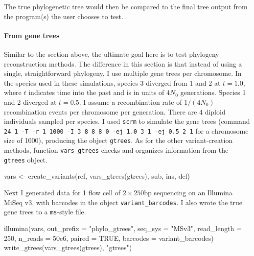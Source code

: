 \documentclass[12pt,]{article}
\newenvironment{Shaded}{}{}
\newcommand{\DataTypeTok}[1]{#1}
\newcommand{\DecValTok}[1]{#1}
\newcommand{\FloatTok}[1]{#1}
\newcommand{\KeywordTok}[1]{\textcolor[rgb]{0.00,0.00,1.00}{#1}}
\newcommand{\NormalTok}[1]{#1}
\newcommand{\OtherTok}[1]{\textcolor[rgb]{1.00,0.25,0.00}{#1}}
\newcommand{\StringTok}[1]{\textcolor[rgb]{0.00,0.50,0.50}{#1}}
\let\oldparagraph\paragraph
\renewcommand{\paragraph}[1]{\oldparagraph{#1}\mbox{}}
\begin{document}
The true phylogenetic tree would then be compared to the final tree output from
the program(s) the user chooses to test.

\hypertarget{from-gene-trees}{%
\paragraph{From gene trees}\label{from-gene-trees}}

Similar to the section above, the ultimate goal here is to test phylogeny
reconstruction methods.
The difference in this section is that instead of using a single, straightforward
phylogeny, I use multiple gene trees per chromosome.
In the species used in these simulations, species 3 diverged from 1 and 2 at \(t = 1.0\),
where \(t\) indicates time into the past and is in units of \(4 N_0\) generations.
Species 1 and 2 diverged at \(t = 0.5\).
I assume a recombination rate of \(1 / (4 N_0)\) recombination events per chromosome
per generation.
There are 4 diploid individuals sampled per species.
I used \texttt{scrm} to simulate the gene trees (command
\texttt{24\ 1\ -T\ -r\ 1\ 1000\ -I\ 3\ 8\ 8\ 8\ 0\ -ej\ 1.0\ 3\ 1\ -ej\ 0.5\ 2\ 1} for a chromosome size of 1000),
producing the object \texttt{gtrees}.
As for the other variant-creation methods, function \texttt{vars\_gtrees} checks and organizes
information from the \texttt{gtrees} object.

\begin{Shaded}
\begin{Highlighting}[]
\NormalTok{vars <-}\StringTok{ }\KeywordTok{create_variants}\NormalTok{(ref, }\KeywordTok{vars_gtrees}\NormalTok{(gtrees), sub, ins, del)}
\end{Highlighting}
\end{Shaded}

Next I generated data for 1 flow cell of \(2 \times 250\)bp sequencing
on an Illumina MiSeq v3, with barcodes in the object \texttt{variant\_barcodes}.
I also wrote the true gene trees to a \texttt{ms}-style file.

\begin{Shaded}
\begin{Highlighting}[]
\KeywordTok{illumina}\NormalTok{(vars, }\DataTypeTok{out_prefix =} \StringTok{"phylo_gtrees"}\NormalTok{, }\DataTypeTok{seq_sys =} \StringTok{"MSv3"}\NormalTok{,}
         \DataTypeTok{read_length =} \DecValTok{250}\NormalTok{, }\DataTypeTok{n_reads =} \FloatTok{50e6}\NormalTok{, }\DataTypeTok{paired =} \OtherTok{TRUE}\NormalTok{, }
         \DataTypeTok{barcodes =}\NormalTok{ variant_barcodes)}
\KeywordTok{write_gtrees}\NormalTok{(}\KeywordTok{vars_gtrees}\NormalTok{(gtrees), }\StringTok{"gtrees"}\NormalTok{)}
\end{Highlighting}
\end{Shaded}
\end{document}
